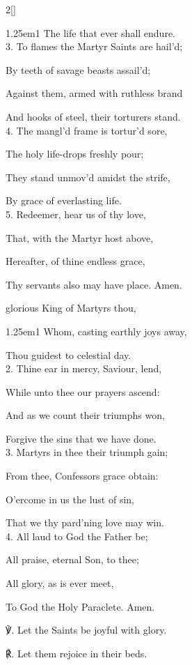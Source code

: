 \begin{paracol}{2}[]
\begin{hangparas}{1.25em}{1}
The life that ever shall endure.\\

3. To flames the Martyr Saints are hail'd;

By teeth of savage beasts assail'd;

Against them, armed with ruthless brand

And hooks of steel, their torturers stand.\\

4. The mangl'd frame is tortur'd sore,

The holy life-drops freshly pour;

They stand unmov'd amidst the strife,

By grace of everlasting life.\\

5. Redeemer, hear us of thy love,

That, with the Martyr host above,

Hereafter, of thine endless grace,

Thy servants also may have place. Amen.
\end{hangparas}

\mattinsOfficeHymn\label{MartyrsMattins}

 glorious King of Martyrs thou,


\begin{hangparas}{1.25em}{1}
Whom, casting earthly joys away,

Thou guidest to celestial day.\\

2. Thine ear in mercy, Saviour, lend,

While unto thee our prayers ascend:

And as we count their triumphs won,

Forgive the sins that we have done.\\

3. Martyrs in thee their triumph gain;

From thee, Confessors grace obtain:

O'ercome in us the lust of sin,

That we thy pard'ning love may win.\\

4. All laud to God the Father be;

All praise, eternal Son, to thee;

All glory, as is ever meet,

To God the Holy Paraclete. Amen.\\
\end{hangparas}

℣. Let the Saints be joyful with glory.

℟. Let them rejoice in their beds.


\fussy
\end{paracol}


